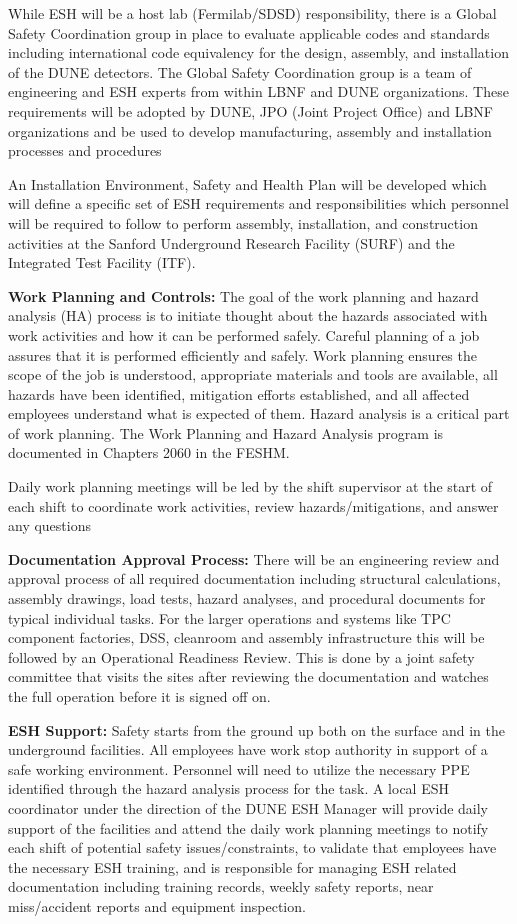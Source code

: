 While ESH will be  a host lab (Fermilab/SDSD) responsibility, there is a  Global Safety Coordination group in place to evaluate applicable codes and standards including international code equivalency for the design, assembly, and installation of the DUNE detectors. The Global Safety Coordination group is  a team of engineering and ESH experts from within LBNF and DUNE organizations.  These requirements will be adopted by DUNE, JPO (Joint Project Office) and LBNF organizations and be used to develop manufacturing, assembly and installation processes and procedures 

 An Installation Environment, Safety and Health Plan will be developed which will define a specific set of ESH requirements and responsibilities which personnel will be required to follow to perform assembly, installation, and construction activities at the Sanford Underground Research Facility (SURF) and the Integrated Test Facility (ITF). 

{\bf Work Planning and Controls:} The goal of the work planning and hazard analysis (HA) process is to initiate thought about the hazards associated with work activities and how it can be performed safely. Careful planning of a job assures that it is performed efficiently and safely. Work planning ensures the scope of the job is understood, appropriate materials and tools are available, all hazards have been identified, mitigation efforts established, and all affected employees understand what is expected of them. Hazard analysis is a critical part of work planning.  The Work Planning and Hazard Analysis program is documented in Chapters 2060 in the FESHM.

Daily work planning meetings will be led by the shift supervisor at the start of each shift to coordinate work activities, review hazards/mitigations, and answer any questions

{\bf Documentation Approval Process:} There will be an engineering review and approval process of all required documentation including structural calculations, assembly drawings, load tests, hazard analyses, and procedural documents for typical individual tasks.  For the larger operations and systems like TPC component factories, DSS, cleanroom and assembly infrastructure this will be followed by an Operational Readiness Review. This is done by a joint safety committee that visits the sites after reviewing the documentation and watches the full operation before it is signed off on.

{\bf ESH Support:} Safety starts from the ground up both on the surface and in the underground facilities. All employees have work stop authority in support of  a safe working environment. Personnel will need to utilize the necessary PPE identified through the hazard analysis process for the task. A local ESH coordinator under the direction of the DUNE ESH Manager will provide daily support of the facilities and attend the daily work planning meetings to notify each shift of potential safety issues/constraints, to validate that  employees have the necessary ESH training, and is responsible for managing ESH related  documentation including training records, weekly safety reports, near miss/accident reports and equipment inspection.

